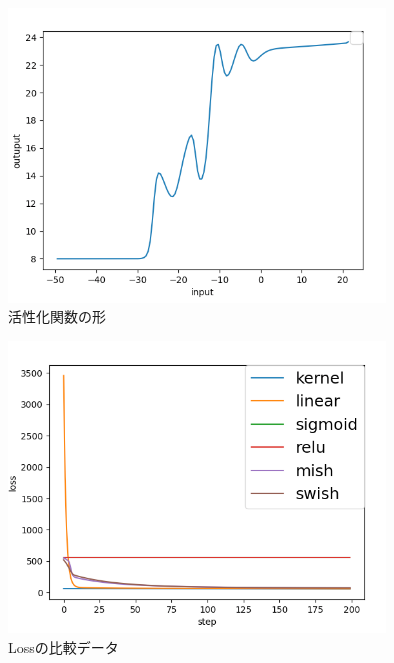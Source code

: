 \begin{figure}[hbtp]
    \begin{center}
        \includegraphics[width=10cm]{asset/boston_0000001_SGDkaiming_normal__non_200_function_2.png}
            \caption{活性化関数の形}
            \label{history_af}
    \end{center}
\end{figure}


\begin{figure}[hbtp]
    \begin{center}
        \includegraphics[width=10cm]{asset/boston_0000001_SGDkaiming_normal__non_200.png}
            \caption{Lossの比較データ}
            \label{history_af}
    \end{center}
\end{figure}



